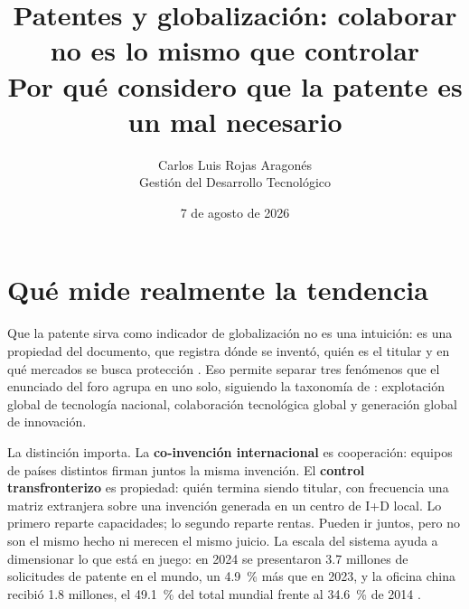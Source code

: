 \documentclass[11pt,letterpaper]{article}
\title{\vspace{-1.2cm}\textbf{Patentes y globalización: colaborar no es lo mismo
que controlar}\\
\large Por qué considero que la patente es un mal necesario}
\author{Carlos Luis Rojas Aragonés\\
\small Gestión del Desarrollo Tecnológico}
\date{\small 7 de agosto de 2026}
\begin{document}
\maketitle
\vspace{-0.8em}

\section*{Qué mide realmente la tendencia}

Que la patente sirva como indicador de globalización no es una intuición: es una
propiedad del documento, que registra dónde se inventó, quién es el titular y en
qué mercados se busca protección \parencite{guellec2001,oecd2009}. Eso permite
separar tres fenómenos que el enunciado del foro agrupa en uno solo, siguiendo
la taxonomía de \textcite{archibugi1995}: explotación global de tecnología
nacional, colaboración tecnológica global y generación global de innovación.

La distinción importa. La \textbf{co-invención internacional} es cooperación:
equipos de países distintos firman juntos la misma invención. El \textbf{control
transfronterizo} es propiedad: quién termina siendo titular, con frecuencia una
matriz extranjera sobre una invención generada en un centro de I+D local. Lo
primero reparte capacidades; lo segundo reparte rentas. Pueden ir juntos, pero
no son el mismo hecho ni merecen el mismo juicio. La escala del sistema ayuda a
dimensionar lo que está en juego: en 2024 se presentaron \num{3.7} millones de
solicitudes de patente en el mundo, un \SI{4.9}{\percent} más que en 2023, y la
oficina china recibió \num{1.8} millones, el \SI{49.1}{\percent} del total
mundial frente al \SI{34.6}{\percent} de 2014 \parencite{wipo2025}.
\end{document}
